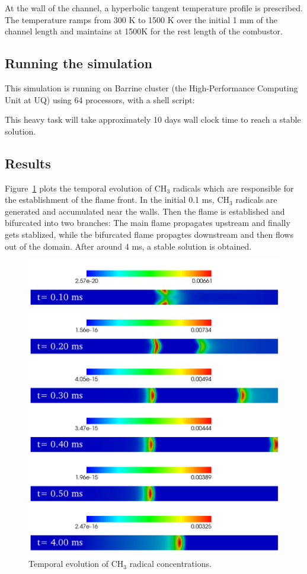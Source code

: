 At the wall of the channel, a hyperbolic tangent temperature profile is prescribed.
The temperature ramps from 300 K to 1500 K over the initial 1 mm of the channel length
and maintains at 1500K for the rest length of the combustor.\\
\noindent\topbar

\bottombar

\subsection{Running the simulation}
%
This simulation is running on Barrine cluster (the High-Performance Computing Unit at UQ)
using 64 processors, with a shell script:\\
\noindent\topbar

\bottombar

This heavy task will take approximately 10 days wall clock time to reach a stable solution.

\subsection{Results}
%
Figure~\ref{fig:CH3} plots the temporal evolution of CH$_3$ radicals which are responsible
for the establishment of the flame front. In the initial 0.1 ms, CH$_3$ radicals are generated
and accumulated near the walls. Then the flame is established and bifurcated into two branches:
The main flame propagates upstream and finally gets stablized, while the bifurcated flame propagtes
downstream and then flows out of the domain. After around 4 ms, a stable solution is obtained.

\begin{figure}[h]
\begin{center}
\includegraphics[width=15cm]{../2D/micro-combustion/CH3.png}
\caption{Temporal evolution of CH$_3$ radical concentrations.}
\label{fig:CH3}
\end{center}
\end{figure}